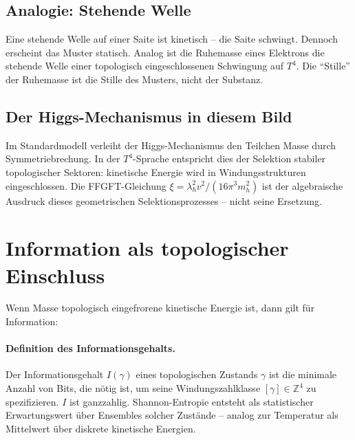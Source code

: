 \subsection{Analogie: Stehende Welle}

Eine stehende Welle auf einer Saite ist kinetisch --
die Saite schwingt. Dennoch erscheint das Muster statisch.
Analog ist die Ruhemasse eines Elektrons die stehende
Welle einer topologisch eingeschlossenen Schwingung auf \(T^4\).
Die \enquote{Stille} der Ruhemasse ist die Stille des Musters,
nicht der Substanz.

\subsection{Der Higgs-Mechanismus in diesem Bild}

Im Standardmodell verleiht der Higgs-Mechanismus den Teilchen Masse
durch Symmetriebrechung. In der \(T^4\)-Sprache entspricht
dies der Selektion stabiler topologischer Sektoren: kinetische Energie
wird in Windungsstrukturen eingeschlossen.
Die FFGFT-Gleichung \(\xi = \lambda_h^2 v^2 / (16\pi^3 m_h^2)\)
ist der algebraische Ausdruck dieses geometrischen
Selektionsprozesses -- nicht seine Ersetzung.

\section{Information als topologischer Einschluss}

Wenn Masse topologisch eingefrorene kinetische Energie ist,
dann gilt für Information:

\begin{center}
\renewcommand{\arraystretch}{1.4}
\end{center}

\paragraph{Definition des Informationsgehalts.}
Der Informationsgehalt \(I(\gamma)\) eines topologischen Zustands \(\gamma\)
ist die minimale Anzahl von Bits, die nötig ist,
um seine Windungszahlklasse \([\gamma] \in \mathbb{Z}^4\) zu spezifizieren.
\(I\) ist ganzzahlig.
Shannon-Entropie entsteht als statistischer Erwartungswert über
Ensembles solcher Zustände -- analog zur Temperatur als Mittelwert
über diskrete kinetische Energien.


